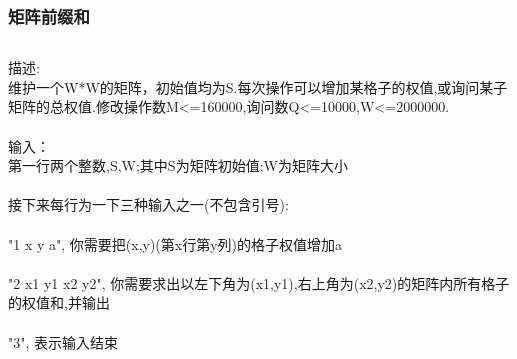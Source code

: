 \documentclass[twoside]{article}
\begin{document}
\subsubsection{矩阵前缀和}
\begin{lstlisting}
\end{lstlisting}
描述: \\
维护一个W*W的矩阵，初始值均为S.每次操作可以增加某格子的权值,或询问某子矩阵的总权值.修改操作数M<=160000,询问数Q<=10000,W<=2000000.\\
\\
输入：\\
第一行两个整数,S,W;其中S为矩阵初始值;W为矩阵大小\\
\\
接下来每行为一下三种输入之一(不包含引号):\\
\\
"1 x y a", 你需要把(x,y)(第x行第y列)的格子权值增加a\\
\\
"2 x1 y1 x2 y2", 你需要求出以左下角为(x1,y1),右上角为(x2,y2)的矩阵内所有格子的权值和,并输出\\
\\
"3", 表示输入结束\\
\end{document}
